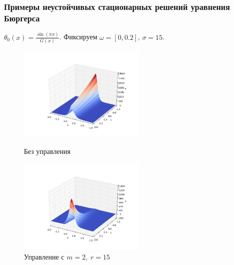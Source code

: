 \documentclass{beamer}
\begin{document}
\begin{frame}
\frametitle{Примеры неустойчивых стационарных решений уравнения Бюргерса}

$\theta_0(x) = \frac{\sin(\pi x)}{G(x)}$. Фиксируем $\omega = [0, 0.2]$, $\sigma = 15$. 


\begin{figure}[H]
\centering
\begin{minipage}{.5\textwidth}
  \centering
  \includegraphics[width=2.4in]{ex_s15}
  \caption{Без управления}
  \label{fig:test1}
\end{minipage}%
\begin{minipage}{.5\textwidth}
  \centering
  \includegraphics[width=2.4in]{re_s15}
  \caption{Управление с $m = 2, \; r = 15$}
  \label{fig:test2}
\end{minipage}
\end{figure}


\end{frame}
\end{document}
